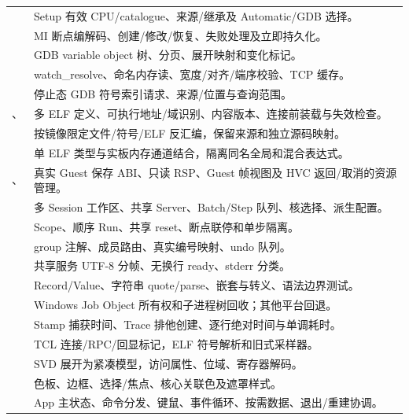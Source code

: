 \documentclass[UTF8,a4paper,11pt,oneside,fontset=none]{ctexart}
\begin{document}
\begin{longtable}{@{}P{55mm}P{106mm}@{}}
 & Setup 有效 CPU/catalogue、来源/继承及 Automatic/GDB 选择。\\
 & MI 断点编解码、创建/修改/恢复、失败处理及立即持久化。\\
 & GDB variable object 树、分页、展开映射和变化标记。\\
 & watch\_resolve、命名内存读、宽度/对齐/端序校验、TCP 缓存。\\
 & 停止态 GDB 符号索引请求、来源/位置与查询范围。\\
、 & 多 ELF 定义、可执行地址/域识别、内容版本、连接前装载与失效检查。\\
 & 按镜像限定文件/符号/ELF 反汇编，保留来源和独立源码映射。\\
 & 单 ELF 类型与实板内存通道结合，隔离同名全局和混合表达式。\\
、 & 真实 Guest 保存 ABI、只读 RSP、Guest 帧视图及 HVC 返回/取消的资源管理。\\
 & 多 Session 工作区、共享 Server、Batch/Step 队列、核选择、派生配置。\\
 & Scope、顺序 Run、共享 reset、断点联停和单步隔离。\\
 & group 注解、成员路由、真实编号映射、undo 队列。\\
 & 共享服务 UTF-8 分帧、无换行 ready、stderr 分类。\\
 & Record/Value、字符串 quote/parse、嵌套与转义、语法边界测试。\\
 & Windows Job Object 所有权和子进程树回收；其他平台回退。\\
 & Stamp 捕获时间、Trace 排他创建、逐行绝对时间与单调耗时。\\
 & TCL 连接/RPC/回显标记，ELF 符号解析和旧式采样器。\\
 & SVD 展开为紧凑模型，访问属性、位域、寄存器解码。\\
 & 色板、边框、选择/焦点、核心关联色及遮罩样式。\\
 & App 主状态、命令分发、键鼠、事件循环、按需数据、退出/重建协调。\\

\end{longtable}
\end{document}
